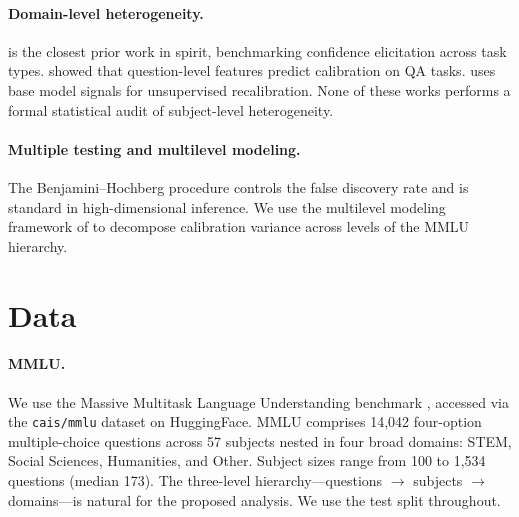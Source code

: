 \documentclass[11pt]{article}
\begin{document}
\paragraph{Domain-level heterogeneity.}
\citet{xiong2024can} is the closest prior work in spirit, benchmarking confidence
elicitation across task types. \citet{jiang2021can} showed that question-level features
predict calibration on QA tasks. \citet{tan2026basecal} uses base model signals for unsupervised recalibration.
None of these works performs a formal statistical audit of subject-level heterogeneity.

\paragraph{Multiple testing and multilevel modeling.}
The Benjamini--Hochberg procedure \citep{bh1995} controls the false discovery rate and
is standard in high-dimensional inference. We use the multilevel modeling framework of
\citet{raudenbush2002hierarchical} to decompose calibration variance across levels of
the MMLU hierarchy.

\section{Data}

\paragraph{MMLU.}
We use the Massive Multitask Language Understanding benchmark
\citep{hendrycks2021measuring}, accessed via the \texttt{cais/mmlu} dataset on
HuggingFace. MMLU comprises 14,042 four-option multiple-choice questions across 57
subjects nested in four broad domains: STEM, Social Sciences, Humanities, and Other.
Subject sizes range from 100 to 1,534 questions (median 173). The three-level
hierarchy---questions $\to$ subjects $\to$ domains---is natural for the proposed
analysis. We use the test split throughout.
\end{document}
